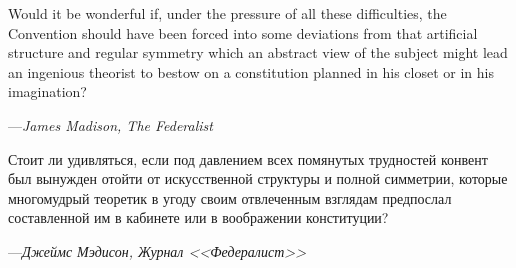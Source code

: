 \begingroup
\raggedright
\list{}{\rightmargin=8pc \leftmargin=8pc}\item[] \small
Would it be wonderful if, under the pressure of all these difficulties,
the Convention should have been forced into some deviations from that
artificial structure and regular symmetry which an abstract view of the
subject might lead an ingenious theorist to bestow on a constitution
planned in his closet or in his imagination?
\par\vskip 4pt
\begin{tabbing}
---\={\it James Madison, The Federalist} \\
\end{tabbing}
\endlist
\endgroup

\newpage 

\null
\vskip 1in

\begingroup
\raggedright
\list{}{\rightmargin=8pc \leftmargin=8pc}\item[] \small
Стоит ли удивляться, если под давлением всех помянутых трудностей конвент был
вынужден отойти от искусственной структуры и полной симметрии, которые
многомудрый теоретик в угоду своим отвлеченным взглядам предпослал составленной
им в кабинете или в воображении конституции?

\par\vskip 4pt
\begin{tabbing}
---\={\it Джеймс Мэдисон, Журнал <<Федералист>>} \\
 \\
\end{tabbing}
\endlist
\endgroup


